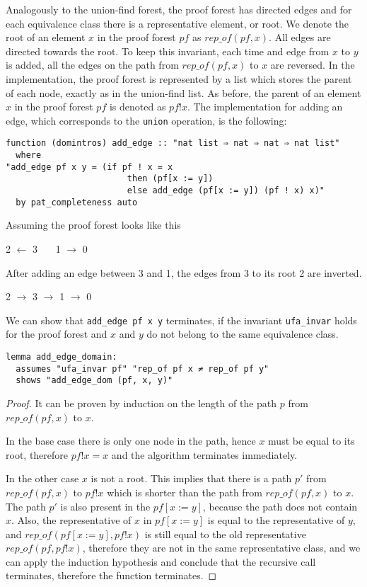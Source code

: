 Analogously to the union-find forest, the proof forest has directed edges and for each equivalence class there is a representative element, or root. We denote the root of an element $x$ in the proof forest $pf$ as $rep\_of(pf, x)$. All edges are directed towards the root. To keep this invariant, each time and edge from $x$ to $y$ is added, all the edges on the path from $rep\_of(pf, x)$ to $x$ are reversed.
In the implementation, the proof forest is represented by a list which stores the parent of each node, exactly as in the union-find list. As before, the parent of an element $x$ in the proof forest $pf$ is denoted as $pf ! x$. The implementation for adding an edge, which corresponds to the \lstinline{union} operation, is the following:

\begin{lstlisting}
function (domintros) add_edge :: "nat list ⇒ nat ⇒ nat ⇒ nat list"
  where
"add_edge pf x y = (if pf ! x = x
                        then (pf[x := y])
                        else add_edge (pf[x := y]) (pf ! x) x)"
  by pat_completeness auto
\end{lstlisting}

\begin{exmp}
Assuming the proof forest looks like this

2 $\longleftarrow$ 3 \ \ \ 1 $\longrightarrow$ 0 \

After adding an edge between 3 and 1, the edges from 3 to its root 2 are inverted.

2 $\longrightarrow$ 3 $\longrightarrow$ 1 $\longrightarrow$ 0 \
\end{exmp}

We can show that \lstinline{add_edge pf x y} terminates, if the invariant \lstinline{ufa_invar} holds for the proof forest and $x$ and $y$ do not belong to the same equivalence class.

\begin{lstlisting}
lemma add_edge_domain:
  assumes "ufa_invar pf" "rep_of pf x ≠ rep_of pf y"
  shows "add_edge_dom (pf, x, y)"
\end{lstlisting}

\begin{proof}
It can be proven by induction on the length of the path $p$ from $rep\_of(pf, x)$ to $x$.

In the base case there is only one node in the path, hence $x$ must be equal to its root, therefore $pf ! x = x$ and the algorithm terminates immediately.

In the other case $x$ is not a root. This implies that there is a path $p'$ from $rep\_of(pf,x)$ to $pf!x$ which is shorter than the path from $rep\_of(pf,x)$ to $x$. The path $p'$ is also present in the $pf[x := y]$, because the path does not contain $x$. Also, the representative of $x$ in $pf[x := y]$ is equal to the representative of $y$, and $rep\_of(pf[x := y],pf!x)$ is still equal to the old representative $rep\_of(pf,pf!x)$, therefore they are not in the same representative class, and we can apply the induction hypothesis and conclude that the recursive call terminates, therefore the function terminates.
\end{proof}

